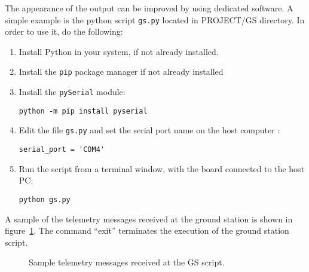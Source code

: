 The appearance of the output can be improved by using dedicated software. A simple example is the python script {\tt gs.py} located in PROJECT/GS directory. In order to use it, do the following:
\begin{enumerate}
\item Install Python in your system, if not already installed.
\item Install the {\tt pip} package manager if not already installed
\item Install the {\tt pySerial} module:
\begin{verbatim}
python -m pip install pyserial
\end{verbatim}
\item Edit the file {\tt gs.py} and set the serial port name on the host computer :
\begin{verbatim}
serial_port = 'COM4'
\end{verbatim}

\item Run the script from a terminal window, with the board connected to the host PC:
\begin{verbatim}
python gs.py
\end{verbatim}
\end{enumerate}
A sample of the telemetry messages received at the ground station is shown in figure~\ref{fig:gs-output}. The command ``exit'' terminates the execution of the ground station script.

\begin{figure}[h]
            \caption{Sample telemetry messages received at the GS script.}
            \label{fig:gs-output}
\end{figure}

